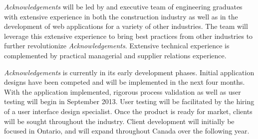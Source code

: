 {\it Acknowledgements} will be led by and executive team of engineering graduates with extensive experience in both the construction industry as well as in the development of web applications for a variety of other industries. The team will leverage this extensive experience to bring best practices from other industries to further revolutionize {\it Acknowledgements}. Extensive technical experience is complemented by practical managerial and supplier relations experience. 

{\it Acknowledgements} is currently in its early development phases. Initial application designs have been competed and will be implemented in the next four months. With the application implemented, rigorous process validation as well as user testing will begin in September 2013. User testing will be facilitated by the hiring of a user interface design specialist. Once the product is ready for market, clients will be sought throughout the industry. Client development will initially be focused in Ontario, and will expand throughout Canada over the following year.